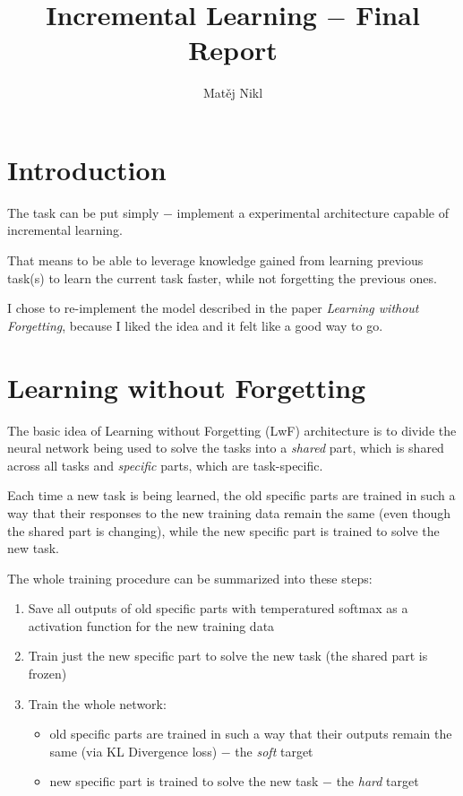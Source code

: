 \documentclass[a4paper,twocolumn]{article}
\title{Incremental Learning $-$ Final Report} \author{Matěj Nikl}
\begin{document}
 \maketitle


\section{Introduction}
The task can be put simply $-$ implement a experimental architecture capable of
incremental learning.

That means to be able to leverage knowledge gained from learning previous
task(s) to learn the current task faster, while not forgetting the previous
ones.

I chose to re-implement the model described in the paper \textit{Learning
without Forgetting}, because I liked the idea and it felt like a good way to go.

\section{Learning without Forgetting}
The basic idea of Learning without Forgetting (LwF) architecture is to divide
the neural network being used to solve the tasks into a \textit{shared} part,
which is shared across all tasks and \textit{specific} parts, which are
task-specific.

Each time a new task is being learned, the old specific parts are trained in
such a way that their responses to the new training data remain the same (even
though the shared part is changing), while the new specific part is trained to
solve the new task.

The whole training procedure can be summarized into these steps:
\begin{enumerate}
    \item Save all outputs of old specific parts with temperatured softmax as a
        activation function for the new training data
    \item Train just the new specific part to solve the new task (the shared
        part is frozen)
    \item Train the whole network:
        \begin{itemize}
            \item old specific parts are trained in such a way that their
                outputs remain the same (via KL Divergence loss) $-$ the
                \textit{soft} target
            \item new specific part is trained to solve the new task $-$ the
                \textit{hard} target
        \end{itemize}
\end{enumerate}
\end{document}
